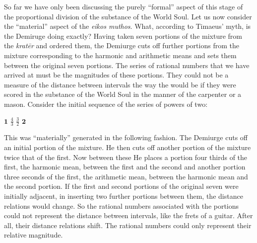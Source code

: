 So far we have only been discussing the purely ``formal'' aspect of this stage of the proportional division of the substance of the World Soul. Let us now consider the ``material'' aspect of the \emph{eikos muthos}. What, according to Timaeus' myth, is the Demiruge doing exactly? Having taken seven portions of the mixture from the \emph{kratēr} and ordered them, the Demiurge cuts off further portions from the mixture corresponding to the harmonic and arithmetic means and sets them between the original seven portions. The series of rational numbers that we have arrived at must be the magnitudes of these portions. They could not be a measure of the distance between intervals the way the would be if they were scored in the substance of the World Soul in the manner of the carpenter or a mason. Consider the initial sequence of the series of powers of two:
\begin{center}
	\( \mathbf{1} \) \( \frac{4}{3} \) \( \frac{3}{2} \) \( \mathbf{2} \)
\end{center}
This was ``materially'' generated in the following fashion. The Demiurge cuts off an initial portion of the mixture. He then cuts off another portion of the mixture twice that of the first. Now between these He places a portion four thirds of the first, the harmonic mean, between the first and the second and another portion three seconds of the first, the arithmetic mean, between the harmonic mean and the second portion. If the first and second portions of the original seven were initially adjacent, in inserting two further portions between them, the distance relations would change. So the rational numbers associated with the portions could not represent the distance between intervals, like the frets of a guitar. After all, their distance relations shift. The rational numbers could only represent their relative magnitude.

